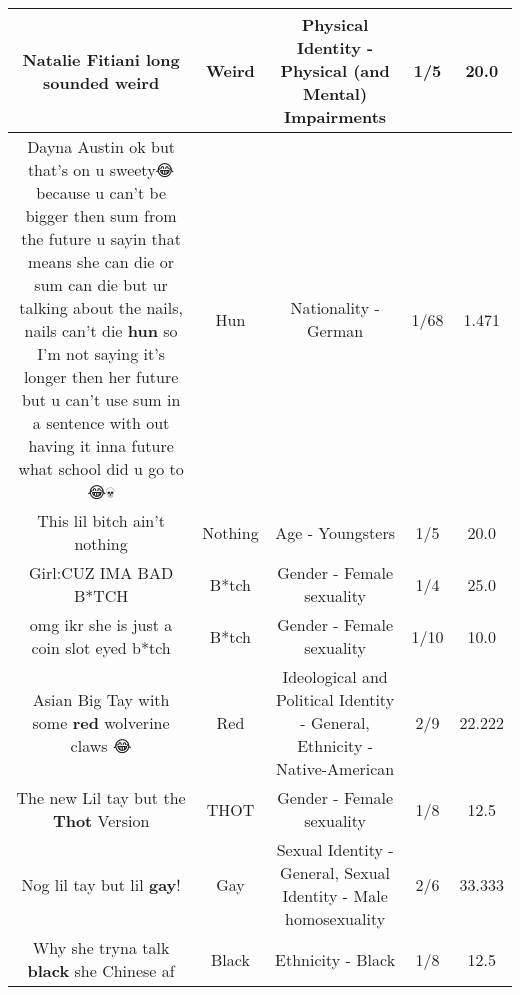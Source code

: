 \documentclass[11pt]{article}
\newlength\mylength
\begin{document}
\begin{center}
\begin{longtable}{|C{.65\mylength}|C{.30\mylength}|C{.12\mylength}|C{.12\mylength}|C{.12\mylength}|}
  \small Natalie Fitiani long sounded weird\normalsize   & Weird & Physical Identity - Physical (and Mental) Impairments & 1/5 & 20.0 \\  \hline
  \small Dayna  Austin ok but that's on u sweety😂 because u can't be bigger then sum from the future u sayin that means she can die or sum can die but ur talking about the nails, nails can't die \textbf{hun} so I'm not saying it's longer then her future but u can't use sum in a sentence with out having it inna future what school did u go to😂💀\normalsize   & Hun & Nationality - German & 1/68 & 1.471 \\  \hline
  \small This lil bitch  ain't nothing\normalsize   & Nothing & Age - Youngsters & 1/5 & 20.0 \\  \hline
  \small Girl:CUZ IMA BAD B*TCH\normalsize   & B*tch & Gender - Female sexuality & 1/4 & 25.0 \\  \hline
  \small omg ikr she is just a coin slot eyed b*tch\normalsize   & B*tch & Gender - Female sexuality & 1/10 & 10.0 \\  \hline
  \small Asian Big Tay with some \textbf{r\textbf{ed}} wolverine claws 😂\normalsize   & Red &  Ideological and Political Identity - General, Ethnicity - Native-American & 2/9 & 22.222 \\  \hline
  \small The new Lil tay but the \textbf{Thot} Version\normalsize   & THOT & Gender - Female sexuality & 1/8 & 12.5 \\  \hline
  \small Nog lil tay but lil \textbf{g\textbf{ay}}!\normalsize   & Gay & Sexual Identity - General, Sexual Identity - Male homosexuality & 2/6 & 33.333 \\  \hline
  \small Why she tryna talk \textbf{black} she Chinese af\normalsize   & Black & Ethnicity - Black & 1/8 & 12.5 \\  \hline

\end{longtable}
\end{center}
\end{document}
